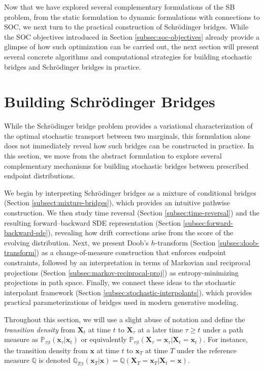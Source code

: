 \documentclass{article}
\begin{document}
Now that we have explored several complementary formulations of the SB problem, from the static formulation to dynamic formulations with connections to SOC, we next turn to the practical construction of Schrödinger bridges. While the SOC objectives introduced in Section \ref{subsec:soc-objectives} already provide a glimpse of how such optimization can be carried out, the next section will present several concrete algorithms and computational strategies for building stochastic bridges and Schrödinger bridges in practice.

\newpage
\section{Building Schrödinger Bridges}
\label{sec:building-stochastic-bridge}
While the Schrödinger bridge problem provides a variational characterization of the optimal stochastic transport between two marginals, this formulation alone does not immediately reveal how such bridges can be constructed in practice. In this section, we move from the abstract formulation to explore several complementary mechanisms for building stochastic bridges between prescribed endpoint distributions.

We begin by interpreting Schrödinger bridges as a mixture of conditional bridges (Section \ref{subsect:mixture-bridges}), which provides an intuitive pathwise construction. We then study time reversal (Section \ref{subsec:time-reversal}) and the resulting forward–backward SDE representation (Section \ref{subsec:forward-backward-sde}), revealing how drift corrections arise from the score of the evolving distribution. Next, we present Doob’s $h$-transform (Section \ref{subsec:doob-transform}) as a change-of-measure construction that enforces endpoint constraints, followed by an interpretation in terms of Markovian and reciprocal projections (Section \ref{subsec:markov-reciprocal-proj}) as entropy-minimizing projections in path space. Finally, we connect these ideas to the stochastic interpolant framework (Section \ref{subsec:stochastic-interpolants}), which provides practical parameterizations of bridges used in modern generative modeling. 

Throughout this section, we will use a slight abuse of notation and define the \textit{transition density} from $\boldsymbol{X}_t$ at time $t$ to $\boldsymbol{X}_\tau$ at a later time $\tau \geq t$ under a path measure as $\mathbb{P}_{\tau |t}(\boldsymbol{x}_\tau|\boldsymbol{x}_t)$ or equivalently $\mathbb{P}_{\tau |t}(\boldsymbol{X}_\tau=\boldsymbol{x}_\tau|\boldsymbol{X}_t=\boldsymbol{x}_t)$. For instance, the transition density from $\boldsymbol{x}$ at time $t$ to $\boldsymbol{x}_T$ at time $T$ under the reference measure $\mathbb{Q}$ is denoted $\mathbb{Q}_{T|t}(\boldsymbol{x}_T|\boldsymbol{x})=\mathbb{Q}(\boldsymbol{X}_T=\boldsymbol{x}_T|\boldsymbol{X}_t=\boldsymbol{x})$.
\end{document}

